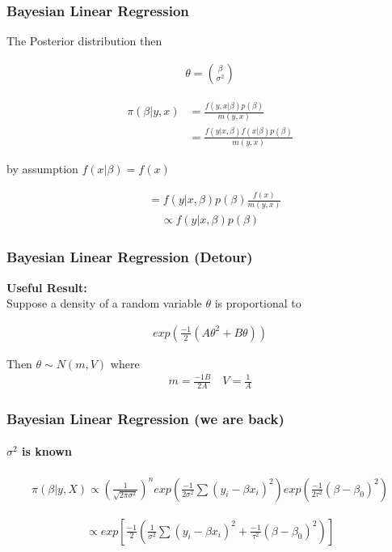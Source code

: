 \documentclass[
  shownotes,
  xcolor={svgnames},
  hyperref={colorlinks,citecolor=DarkBlue,linkcolor=DarkRed,urlcolor=DarkBlue}
  , aspectratio=169]{beamer}
\begin{document}
\begin{frame}[fragile]
\frametitle{Bayesian Linear Regression}
The Posterior distribution then 

\begin{align}

\theta = \binom{\beta}{\sigma^2}

\end{align}

\begin{align}
\pi (\beta|y,x) &= \frac{f(y,x|\beta)p(\beta)}{m(y,x)} \\
&= \frac{f(y|x,\beta)f(x|\beta)p(\beta)}{m(y,x)}
\end{align}

by assumption $f(x|\beta)=f(x)$

\begin{align}
&= f(y|x,\beta)p(\beta)\frac{f(x)}{m(y,x)}
\end{align}
\begin{align}
\propto f(y|x,\beta)p(\beta)
\end{align}

\end{frame}
\begin{frame}[fragile]
\frametitle{Bayesian Linear Regression (Detour)}
{\bf Useful Result:} \\

\bigskip
Suppose a density of a random variable $\theta$ is proportional to

\begin{align}
  exp\left(\frac{-1}{2}(A\theta^2+B\theta)\right)
\end{align}

Then $\theta\sim N(m,V)$ where
\begin{align}
m=\frac{-1B}{2A} \,\,\,\,\,\, V=\frac{1}{A}
\end{align}


\end{frame}
\begin{frame}[fragile]
\frametitle{Bayesian Linear Regression (we are back)}
\framesubtitle{$\sigma^2$ is known}

\begin{align}
\pi(\beta|y,X) \propto \left(\frac{1}{\sqrt{2\pi\sigma^2}}\right)^n exp\left(\frac{-1}{2\sigma^2}\sum(y_i-\beta x_i)^2\right)exp\left(\frac{-1}{2\tau^2}(\beta-\beta_0)^2\right)
\end{align}


\begin{align}
\propto  exp \left[ \frac{-1}{2} \left(\frac{1}{\sigma^2}\sum(y_i-\beta x_i)^2 + \frac{-1}{\tau^2}(\beta-\beta_0)^2\right)\right]
\end{align}

\end{frame}
\end{document}
